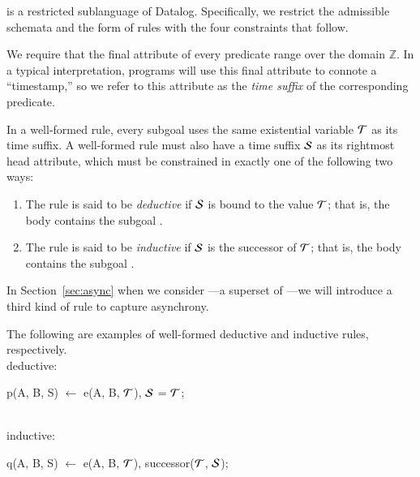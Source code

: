 \slang is a restricted sublanguage of Datalog.  Specifically, we restrict the
admissible schemata and the form of rules with the four constraints that follow.

We require that the final attribute of every \slang
predicate range over the domain $\mathbb{Z}$.  In a typical
interpretation, \slang programs will use this final attribute to connote a
``timestamp,'' so we refer to this attribute as the \emph{time suffix} of the
corresponding predicate.

%
%
In a well-formed \slang rule, every subgoal uses the same existential variable 
$\Tau$
as its time suffix.  A well-formed
\slang rule must also have a time suffix 
$\SDedalus$ 
as its rightmost head attribute, which must be
constrained in exactly one of the following two ways:
\begin{enumerate}
%
\item The rule is said to be \emph{deductive} if $\SDedalus$ is bound to the
value $\Tau$; that is, the body contains the subgoal \dedalus{$\SDedalus$ = $\Tau$}.
%
\item The rule is said to be {\em inductive} if $\SDedalus$ is the successor of
$\Tau$; that is, the body contains the subgoal .
%
\end{enumerate}

In Section~\ref{sec:async} when we consider \lang---a superset of \slang---we will
introduce a third kind of rule to capture asynchrony.

\begin{example}
The following are examples of well-formed deductive and inductive rules, respectively.
\\
deductive:
\begin{Dedalus}
p(A, B, S) \(\leftarrow\) e(A, B, \(\Tau\)), \(\SDedalus\) = \(\Tau\);
\end{Dedalus}
\\
inductive:
\begin{Dedalus}
q(A, B, S) \(\leftarrow\) e(A, B, \(\Tau\)), successor(\(\Tau\), \(\SDedalus\));
\end{Dedalus}
\end{example}

